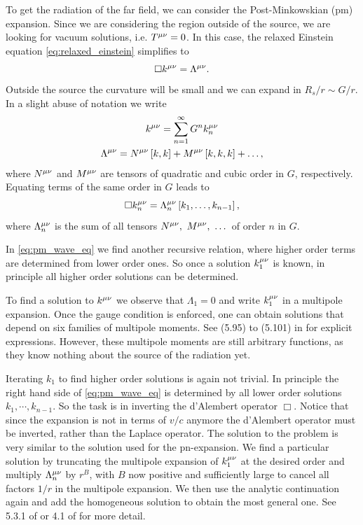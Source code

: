 To get the radiation of the far field, we can consider the Post-Minkowskian (\acrshort{pm}) expansion. Since we are considering the region outside of the source, we are looking for vacuum solutions, i.e. $T^{\mu\nu}=0$. In this case, the relaxed Einstein equation \eqref{eq:relaxed_einstein} simplifies to
\begin{equation}
\Box k^{\mu\nu} = \Lambda^{\mu\nu}.
\end{equation}
Outside the source the curvature will be small and we can expand in $R_s/r\sim G/r$. In a slight abuse of notation we write
\begin{gather}
k^{\mu\nu} = \sum_{n=1}^\infty G^n k_n^{\mu\nu}\\
\Lambda^{\mu\nu} = N^{\mu\nu}\left[k,k\right] + M^{\mu\nu}\left[k,k,k\right]+\dotsc ,
\end{gather}
where $N^{\mu\nu}$ and $M^{\mu\nu}$ are tensors of quadratic and cubic order in $G$, respectively. Equating terms of the same order in $G$ leads to
\begin{equation}\label{eq:pm_wave_eq}
\Box k^{\mu\nu}_n = \Lambda^{\mu\nu}_n\left[k_1, \dotsc, k_{n-1}\right],
\end{equation}
where $\Lambda^{\mu\nu}_n$ is the sum of all tensors $N^{\mu\nu},\ M^{\mu\nu},\ \dotsc$ of order $n$ in $G$.

In \eqref{eq:pm_wave_eq} we find another recursive relation, where higher order terms are determined from lower order ones. So once a solution $k^{\mu\nu}_1$ is known, in principle all higher order solutions can be determined.

To find a solution to $k^{\mu\nu}$ we observe that $\Lambda_1=0$ and write $k^{\mu\nu}_1$ in a multipole expansion. Once the gauge condition is enforced, one can obtain solutions that depend on six families of multipole moments. See (5.95) to (5.101) in \cite{Maggiore:2008aaa} for explicit expressions. However, these multipole moments are still arbitrary functions, as they know nothing about the source of the radiation yet.

Iterating $k_1$ to find higher order solutions is again not trivial. In principle the right hand side of \eqref{eq:pm_wave_eq} is determined by all lower order solutions $k_1, \cdots, k_{n-1}$. So the task is in inverting the d'Alembert operator $\Box$. Notice that since the expansion is not in terms of $v/c$ anymore the d'Alembert operator must be inverted, rather than the Laplace operator. The solution to the problem is very similar to the solution used for the \acrshort{pn}-expansion. We find a particular solution by truncating the multipole expansion of $k^{\mu\nu}_1$ at the desired order and multiply $\Lambda^{\mu\nu}_n$ by $r^B$, with $B$ now positive and sufficiently large to cancel all factors $1/r$ in the multipole expansion. We then use the analytic continuation again and add the homogeneous solution to obtain the most general one. See 5.3.1 of \cite{Maggiore:2008aaa} or 4.1 of \cite{Blanchet:2006aaa} for more detail.


